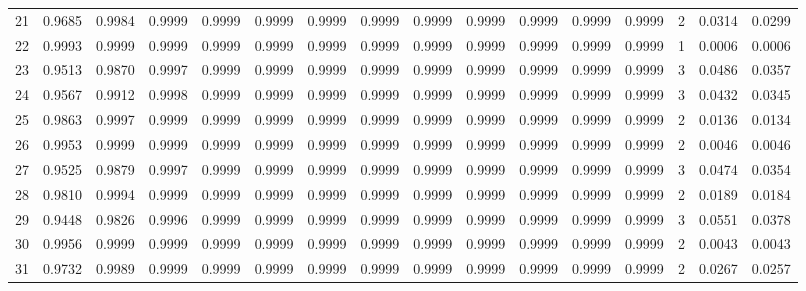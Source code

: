 \begin{tabular}{lrrrrrrrrrrrrrrr}
21  &      0.9685 &  0.9984 &  0.9999 &  0.9999 &  0.9999 &  0.9999 &  0.9999 &  0.9999 &  0.9999 &  0.9999 &   0.9999 &     0.9999 &      2 &                    0.0314 &                     0.0299 \\
22  &      0.9993 &  0.9999 &  0.9999 &  0.9999 &  0.9999 &  0.9999 &  0.9999 &  0.9999 &  0.9999 &  0.9999 &   0.9999 &     0.9999 &      1 &                    0.0006 &                     0.0006 \\
23  &      0.9513 &  0.9870 &  0.9997 &  0.9999 &  0.9999 &  0.9999 &  0.9999 &  0.9999 &  0.9999 &  0.9999 &   0.9999 &     0.9999 &      3 &                    0.0486 &                     0.0357 \\
24  &      0.9567 &  0.9912 &  0.9998 &  0.9999 &  0.9999 &  0.9999 &  0.9999 &  0.9999 &  0.9999 &  0.9999 &   0.9999 &     0.9999 &      3 &                    0.0432 &                     0.0345 \\
25  &      0.9863 &  0.9997 &  0.9999 &  0.9999 &  0.9999 &  0.9999 &  0.9999 &  0.9999 &  0.9999 &  0.9999 &   0.9999 &     0.9999 &      2 &                    0.0136 &                     0.0134 \\
26  &      0.9953 &  0.9999 &  0.9999 &  0.9999 &  0.9999 &  0.9999 &  0.9999 &  0.9999 &  0.9999 &  0.9999 &   0.9999 &     0.9999 &      2 &                    0.0046 &                     0.0046 \\
27  &      0.9525 &  0.9879 &  0.9997 &  0.9999 &  0.9999 &  0.9999 &  0.9999 &  0.9999 &  0.9999 &  0.9999 &   0.9999 &     0.9999 &      3 &                    0.0474 &                     0.0354 \\
28  &      0.9810 &  0.9994 &  0.9999 &  0.9999 &  0.9999 &  0.9999 &  0.9999 &  0.9999 &  0.9999 &  0.9999 &   0.9999 &     0.9999 &      2 &                    0.0189 &                     0.0184 \\
29  &      0.9448 &  0.9826 &  0.9996 &  0.9999 &  0.9999 &  0.9999 &  0.9999 &  0.9999 &  0.9999 &  0.9999 &   0.9999 &     0.9999 &      3 &                    0.0551 &                     0.0378 \\
30  &      0.9956 &  0.9999 &  0.9999 &  0.9999 &  0.9999 &  0.9999 &  0.9999 &  0.9999 &  0.9999 &  0.9999 &   0.9999 &     0.9999 &      2 &                    0.0043 &                     0.0043 \\
31  &      0.9732 &  0.9989 &  0.9999 &  0.9999 &  0.9999 &  0.9999 &  0.9999 &  0.9999 &  0.9999 &  0.9999 &   0.9999 &     0.9999 &      2 &                    0.0267 &                     0.0257 \\

\end{tabular}
